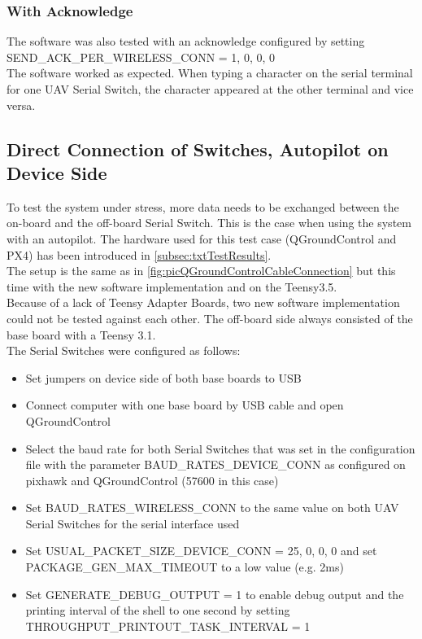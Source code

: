 \subsubsection{With Acknowledge}
The software was also tested with an acknowledge configured by setting SEND\_ACK\_PER\_WIRELESS\_CONN = 1, 0, 0, 0\\
The software worked as expected. When typing a character on the serial terminal for one UAV Serial Switch, the character appeared at the other terminal and vice versa.
%
%
\subsection{Direct Connection of Switches, Autopilot on Device Side} \label{subsec:txtTestDirectConnQGroundControl}
To test the system under stress, more data needs to be exchanged between the on-board and the off-board Serial Switch. This is the case when using the system with an autopilot. The hardware used for this test case (QGroundControl and PX4) has been introduced in \autoref{subsec:txtTestResults}.\\
The setup is the same as in \autoref{fig:picQGroundControlCableConnection} but this time with the new software implementation and on the Teensy3.5.\\
Because of a lack of Teensy Adapter Boards, two new software implementation could not be tested against each other. The off-board side always consisted of the base board with a Teensy 3.1.\\
The Serial Switches were configured as follows:
\begin{itemize}
    \item Set jumpers on device side of both base boards to USB
    \item Connect computer with one base board by USB cable and open QGroundControl
    \item Select the baud rate for both Serial Switches that was set in the configuration file with the parameter BAUD\_RATES\_DEVICE\_CONN as configured on pixhawk and QGroundControl (57600 in this case)
    \item Set BAUD\_RATES\_WIRELESS\_CONN to the same value on both UAV Serial Switches for the serial interface used
    \item Set USUAL\_PACKET\_SIZE\_DEVICE\_CONN = 25, 0, 0, 0 and set PACKAGE\_GEN\_MAX\_TIMEOUT to a low value (e.g. 2ms)
    \item Set GENERATE\_DEBUG\_OUTPUT = 1 to enable debug output and the printing interval of the shell to one second by setting THROUGHPUT\_PRINTOUT\_TASK\_INTERVAL = 1
\end{itemize}
%
